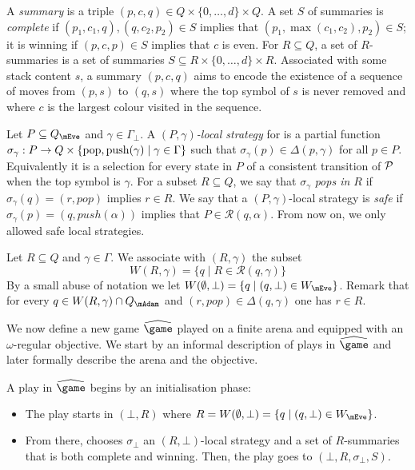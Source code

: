 A \emph{summary} is a triple $(p,c,q)\in Q\times \{0,\dots,d\} \times Q$. A set $S$ of summaries is \emph{complete} if $(p_1,c_1,q),(q,c_2,p_2)\in S$ implies that $(p_1,\max(c_1,c_2),p_2)\in S$; it is winning if $(p,c,p)\in S$ implies that $c$ is even. For $R\subseteq Q$, a set of $R$-summaries is a set of summaries $S\subseteq R\times\{0,\dots,d\}\times R$. Associated with some stack content $s$, a summary $(p,c,q)$ aims to encode the existence of a sequence of moves from $(p,s)$ to $(q,s)$ where the top symbol of $s$ is never removed and where $c$ is the largest colour visited in the sequence. 


Let $P\subseteq Q_\mEve$ and $\gamma\in\Gamma_\bot$. A \emph{$(P,\gamma)$-local strategy} for \Eve is a partial function $\sigma_\gamma:P\rightarrow {Q\times\{\mathrm{pop},\mathrm{push}(\gamma)\mid \gamma\in\Gamma\}}$ such that $\sigma_\gamma(p)\in \Delta(p,\gamma)$ for all $p\in P$. Equivalently it is a selection for every state in $P$ of a consistent transition of $\mathcal{P}$ when the top symbol is $\gamma$. For a subset $R\subseteq Q$, we say that $\sigma_\gamma$ \emph{pops in $R$} if $\sigma_\gamma(q)=(r,pop)$ implies $r\in R$.
We say that a $(P,\gamma)$-local strategy is \emph{safe} if $\sigma_\gamma(p)=(q,push(\alpha))$ implies that $P\in\mathcal{R}(q,\alpha)$. From now on, we only allowed safe local strategies. %

Let $R\subseteq Q$ and $\gamma\in\Gamma$. We associate with $(R,\gamma)$ the subset $$W(R,\gamma)=\{q\mid R\in\mathcal{R}(q,\gamma)\}$$ By a small abuse of notation we let $W(\emptyset,\bot) = \{q\mid (q,\bot)\in W_\mEve\}$. Remark that for every $q\in W(R,\gamma)\cap Q_\mAdam$ and $(r,pop)\in \Delta(q,\gamma)$ one has $r\in R$.

We now define a new game $\hgame$ played on a finite arena and equipped with an $\omega$-regular objective. We start by an informal description of plays in $\hgame$ and later formally describe the arena and the objective. 

A play in $\hgame$ begins by an initialisation phase:
\begin{itemize}
	\item The play starts in $(\bot, R)$ where $R=W(\emptyset,\bot)=\{q\mid (q,\bot)\in W_\mEve\}$.
	\item From there, \Eve chooses $\sigma_\bot$ an $(R,\bot)$-local strategy and a set of $R$-summaries that is both complete and winning. Then, the play goes to $(\bot,R,\sigma_\bot,S)$.
\end{itemize}

